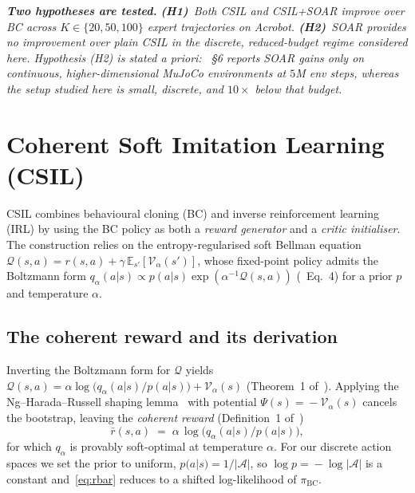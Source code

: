 \documentclass[10pt]{article}
\newcommand{\Aspace}{\mathcal{A}}
\newcommand{\bcpol}{\pi_{\mathrm{BC}}}
\newcommand{\rb}{\bar{r}}
\newcommand{\Q}{\mathcal{Q}}
\newcommand{\V}{\mathcal{V}}
\begin{document}
\noindent\textit{\textbf{Two hypotheses are tested.}
\textbf{(H1)}~Both CSIL and CSIL+SOAR improve over BC across
$K\!\in\!\{20,50,100\}$ expert trajectories on Acrobot.
\textbf{(H2)}~SOAR provides no improvement over plain CSIL in the
discrete, reduced-budget regime considered here. Hypothesis (H2) is
stated a priori: \cite{viel2025ilsoar}~\S6 reports SOAR gains only on
continuous, higher-dimensional MuJoCo environments at $5$M env steps,
whereas the setup studied here is small, discrete, and $10\times$
below that budget.}

\section{Coherent Soft Imitation Learning (CSIL)}\label{sec:csil}

CSIL combines behavioural cloning (BC) and inverse reinforcement
learning (IRL) by using the BC policy as both a \emph{reward generator}
and a \emph{critic initialiser}. The construction relies on the
entropy-regularised soft Bellman equation
$\Q(s,a)=r(s,a)+\gamma\,\mathbb{E}_{s'}[\V_\alpha(s')]$, whose
fixed-point policy admits the Boltzmann form
$q_\alpha(a|s)\propto p(a|s)\exp(\alpha^{-1}\Q(s,a))$
(\cite{watson2023csil}~Eq.~4) for a prior $p$ and temperature $\alpha$.

\subsection{The coherent reward and its derivation}

Inverting the Boltzmann form for $\Q$ yields
$\Q(s,a)=\alpha\log\!\big(q_\alpha(a|s)/p(a|s)\big)+\V_\alpha(s)$
(Theorem~1 of~\cite{watson2023csil}). Applying the Ng--Harada--Russell
shaping lemma~\cite{ng1999shaping} with potential
$\Psi(s)\!=\!-\V_\alpha(s)$ cancels the bootstrap, leaving the
\emph{coherent reward} (Definition~1 of~\cite{watson2023csil})
\begin{equation}\label{eq:rbar}
  \rb(s,a) \;=\; \alpha\,\log\!\big(q_\alpha(a|s)/p(a|s)\big),
\end{equation}
for which $q_\alpha$ is provably soft-optimal at temperature $\alpha$.
For our discrete action spaces we set the prior to uniform,
$p(a|s)\!=\!1/|\Aspace|$, so $\log p\!=\!-\log|\Aspace|$ is a constant
and~\eqref{eq:rbar} reduces to a shifted log-likelihood of $\bcpol$.
\end{document}

